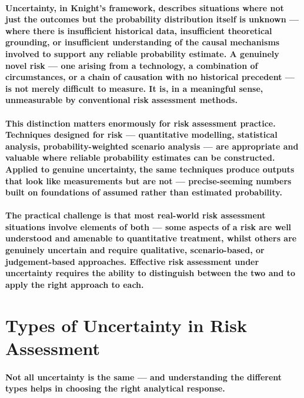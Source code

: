 \paragraph{\textbf{Uncertainty}, in Knight's framework, describes situations where not just the outcomes but the probability distribution itself is unknown — where there is insufficient historical data, insufficient theoretical grounding, or insufficient understanding of the causal mechanisms involved to support any reliable probability estimate. A genuinely novel risk — one arising from a technology, a combination of circumstances, or a chain of causation with no historical precedent — is not merely difficult to measure. It is, in a meaningful sense, unmeasurable by conventional risk assessment methods.}
\paragraph{This distinction matters enormously for risk assessment practice. Techniques designed for risk — quantitative modelling, statistical analysis, probability-weighted scenario analysis — are appropriate and valuable where reliable probability estimates can be constructed. Applied to genuine uncertainty, the same techniques produce outputs that look like measurements but are not — precise-seeming numbers built on foundations of assumed rather than estimated probability.}
\paragraph{The practical challenge is that most real-world risk assessment situations involve elements of both — some aspects of a risk are well understood and amenable to quantitative treatment, whilst others are genuinely uncertain and require qualitative, scenario-based, or judgement-based approaches. Effective risk assessment under uncertainty requires the ability to distinguish between the two and to apply the right approach to each.}

\section{Types of Uncertainty in Risk Assessment}
\paragraph{Not all uncertainty is the same — and understanding the different types helps in choosing the right analytical response.}

